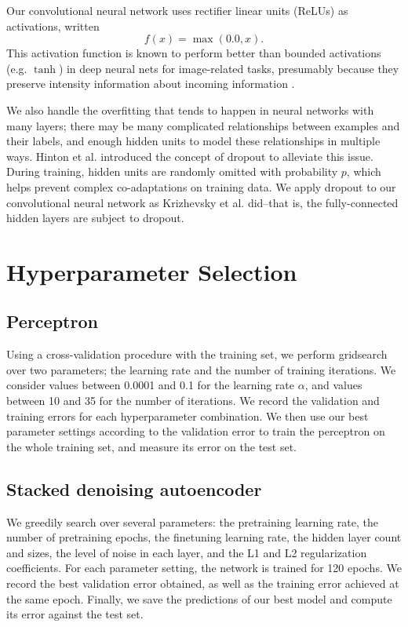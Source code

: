 \documentclass{acm_proc_article-sp}
\begin{document}
Our convolutional neural network uses rectifier linear units (ReLUs) as activations, written  $$f(x) = \max(0.0, x).$$ This activation function is known to perform better than bounded activations (e.g. $\tanh$) in deep neural nets for image-related tasks, presumably because they preserve intensity information about incoming information \cite{Nair}.

We also handle the overfitting that tends to happen in neural networks with many layers; there may be many complicated relationships between examples and their labels, and enough hidden units to model these relationships in multiple ways. Hinton et al. \cite{Hinton} introduced the concept of dropout to alleviate this issue. During training, hidden units are randomly omitted with probability $p$, which helps prevent complex co-adaptations on training data. We apply dropout to our convolutional neural network as Krizhevsky et al. \cite{Krizhevsky} did--that is, the fully-connected hidden layers are subject to dropout.

\section{Hyperparameter Selection}

\subsection{Perceptron}

Using a cross-validation procedure with the training set, we perform gridsearch over two parameters; the learning rate and the number of training iterations. We consider values between 0.0001 and 0.1 for the learning rate $\alpha$, and values between 10 and 35 for the number of iterations. We record the validation and training errors for each hyperparameter combination. We then use our best parameter settings according to the validation error to train the perceptron on the whole training set, and measure its error on the test set.

\subsection{Stacked denoising autoencoder}

We greedily search over several parameters: the pretraining learning rate, the number of pretraining epochs, the finetuning learning rate, the hidden layer count and sizes, the level of noise in each layer, and the L1 and L2 regularization coefficients. For each parameter setting, the network is trained for 120 epochs. We record the best validation error obtained, as well as the training error achieved at the same epoch. Finally, we save the predictions of our best model and compute its error against the test set.
\end{document}
